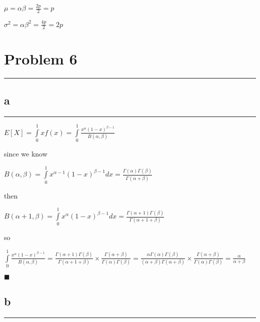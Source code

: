 \documentclass[]{tufte-handout}
\begin{document}
\(\mu = \alpha\beta = \frac{2p}{2} = p\)

\(\sigma^2 = \alpha\beta^2 = \frac{4p}{2} = 2p\)

\hypertarget{problem-6}{%
\section{Problem 6}\label{problem-6}}

\begin{center}\rule{0.5\linewidth}{0.5pt}\end{center}

\hypertarget{a-4}{%
\subsection{a}\label{a-4}}

\begin{center}\rule{0.5\linewidth}{0.5pt}\end{center}

\(E[X] = \int \limits_0^1xf(x) = \int \limits_0^1 \frac{x^\alpha(1-x)^{\beta-1}}{B(\alpha, \beta)}\)

since we know

\(B(\alpha, \beta) = \int\limits^1_0 x^{\alpha-1}(1-x)^{\beta-1}dx = \frac{\Gamma(\alpha)\Gamma(\beta)}{\Gamma(\alpha + \beta)}\)

then

\(B(\alpha + 1, \beta) = \int\limits^1_0 x^{\alpha}(1-x)^{\beta-1}dx = \frac{\Gamma(\alpha + 1)\Gamma(\beta)}{\Gamma(\alpha + 1 + \beta)}\)

so

\(\int \limits_0^1 \frac{x^\alpha(1-x)^{\beta-1}}{B(\alpha, \beta)} = \frac{\Gamma(\alpha + 1)\Gamma(\beta)}{\Gamma(\alpha + 1 + \beta)} \times \frac{\Gamma(\alpha + \beta)}{\Gamma(\alpha)\Gamma(\beta)} = \frac{\alpha\Gamma(\alpha)\Gamma(\beta)}{(\alpha + \beta)\Gamma(\alpha + \beta)} \times \frac{\Gamma(\alpha + \beta)}{\Gamma(\alpha)\Gamma(\beta)} = \frac{\alpha}{\alpha + \beta}\)

\begin{marginfigure}
\(\blacksquare\)
\end{marginfigure}

\hypertarget{b-4}{%
\subsection{b}\label{b-4}}

\begin{center}\rule{0.5\linewidth}{0.5pt}\end{center}
\end{document}
